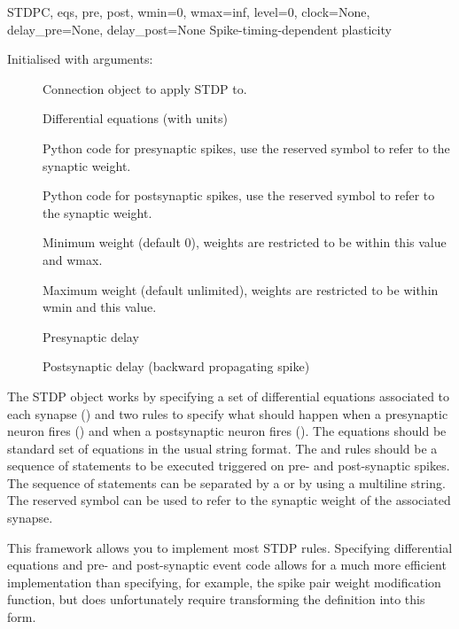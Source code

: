 \documentclass[letterpaper,10pt,english]{manual}
\begin{document}
\hypertarget{brian.STDP}{}\begin{classdesc}{STDP}{C, eqs, pre, post, wmin=0, wmax=inf, level=0, clock=None, delay\_pre=None, delay\_post=None}
Spike-timing-dependent plasticity

Initialised with arguments:
\begin{description}
\item[] \leavevmode
Connection object to apply STDP to.

\item[] \leavevmode
Differential equations (with units)

\item[] \leavevmode
Python code for presynaptic spikes, use the reserved symbol  to
refer to the synaptic weight.

\item[] \leavevmode
Python code for postsynaptic spikes, use the reserved symbol  to
refer to the synaptic weight.

\item[] \leavevmode
Minimum weight (default 0), weights are restricted to be within this
value and wmax.

\item[] \leavevmode
Maximum weight (default unlimited), weights are restricted to be within
wmin and this value.

\item[] \leavevmode
Presynaptic delay

\item[] \leavevmode
Postsynaptic delay (backward propagating spike)

\end{description}

The STDP object works by specifying a set of differential equations
associated to each synapse () and two rules to specify what should
happen when a presynaptic neuron fires () and when a postsynaptic
neuron fires (). The equations should be standard set of equations
in the usual string format. The  and  rules should be a
sequence of statements to be executed triggered on pre- and post-synaptic
spikes. The sequence of statements can be separated by a \code{;} or by
using a multiline string. The reserved symbol  can be used to refer
to the synaptic weight of the associated synapse.

This framework allows you to implement most STDP rules. Specifying
differential equations and pre- and post-synaptic event code allows for a
much more efficient implementation than specifying, for example, the
spike pair weight modification function, but does unfortunately require
transforming the definition into this form.


\end{classdesc}
\end{document}
